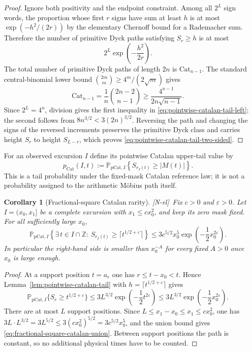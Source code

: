 \documentclass[11pt]{amsart}
\numberwithin{equation}{section}
\theoremstyle{plain}
\newtheorem{corollary}[theorem]{Corollary}
\theoremstyle{definition}
\theoremstyle{remark}
\newcommand{\eps}{\varepsilon}
\newcommand{\tagNE}{\textup{[N-el]}}
\begin{document}
\begin{proof}
Ignore both positivity and the endpoint constraint.  Among all $2^L$ sign
words, the proportion whose first $r$ signs have sum at least $h$ is at most
$\exp(-h^2/(2r))$ by the elementary Chernoff bound for a Rademacher sum.
Therefore the number of primitive Dyck paths satisfying $S_r\ge h$ is at
most
\[
 2^L\exp\!\left(-\frac{h^2}{2r}\right).
\]
The total number of primitive Dyck paths of length $2n$ is $\mathrm{Cat}_{n-1}$.  The
standard central-binomial lower bound
$\binom{2m}{m}\ge4^m/(2\sqrt m)$ gives
\[
 \mathrm{Cat}_{n-1}=\frac1n\binom{2n-2}{n-1}
 \ge\frac{4^{n-1}}{2n\sqrt{n-1}}.
\]
Since $2^L=4^n$, division gives the first inequality in
\eqref{eq:pointwise-catalan-tail-left}; the second follows from
$8n^{3/2}<3(2n)^{3/2}$.  Reversing the path and changing the signs of the
reversed increments preserves the primitive Dyck class and carries height
$S_r$ to height $S_{L-r}$, which proves
\eqref{eq:pointwise-catalan-tail-two-sided}.
\end{proof}

For an observed excursion $I$ define its pointwise Catalan upper-tail value
by
\begin{equation}
\label{eq:pointwise-catalan-pvalue}
 p_{\mathrm{Cat}}(I,t):=
 \mathbb P_{\mathrm{pCat},I}
 \left\{S_{r_I(t)}\ge |M(t)|\right\}.
\end{equation}
This is a tail probability under the fixed-mask Catalan reference law; it is
not a probability assigned to the arithmetic M\"obius path itself.

\begin{corollary}[Fractional-square Catalan rarity]
\label{cor:fractional-square-catalan-rarity}
\tagNE\ Fix $c>0$ and $\eps>0$.  Let $I=(x_0,x_1]$ be a complete excursion with
$x_1\le cx_0^2$, and keep its zero mask fixed.  For all sufficiently large
$x_0$,
\begin{equation}
\label{eq:fractional-square-catalan-union}
 \mathbb P_{\mathrm{pCat},I}
 \left\{\exists\,t\in I\cap\mathbb Z:\ S_{r_I(t)}\ge \lceil t^{1/2+\eps}\rceil\right\}
 \le 3c^{5/2}x_0^5
 \exp\!\left(-\frac12x_0^{2\eps}\right).
\end{equation}
In particular the right-hand side is smaller than $x_0^{-A}$ for every
fixed $A>0$ once $x_0$ is large enough.
\end{corollary}

\begin{proof}
At a support position $t=a_r$ one has $r\le t-x_0<t$.  Hence
Lemma~\ref{lem:pointwise-catalan-tail} with $h=\lceil t^{1/2+\eps}\rceil$ gives
\[
 \mathbb P_{\mathrm{pCat},I}\{S_r\ge t^{1/2+\eps}\}
 \le3L^{3/2}\exp\!\left(-\frac12t^{2\eps}\right)
 \le3L^{3/2}\exp\!\left(-\frac12x_0^{2\eps}\right).
\]
There are at most $L$ support positions.  Since
$L\le x_1-x_0\le x_1\le cx_0^2$, one has
$3L\cdot L^{3/2}=3L^{5/2}\le3(cx_0^2)^{5/2}=3c^{5/2}x_0^5$, and the union
bound gives
\eqref{eq:fractional-square-catalan-union}.  Between support positions the
path is constant, so no additional physical times have to be counted.
\end{proof}
\end{document}
